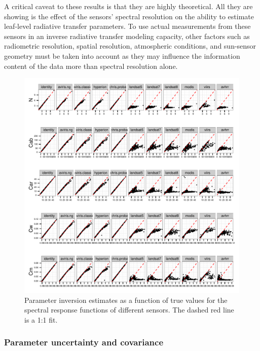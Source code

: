 {A critical caveat to these results is that they are highly theoretical. All
they are showing is the effect of the sensors' spectral resolution on the
ability to estimate leaf-level radiative transfer parameters. To use actual
measurements from these sensors in an inverse radiative transfer modeling
capacity, other factors such as radiometric resolution, spatial resolution,
atmospheric conditions, and sun-sensor geometry must be taken into account as
they may influence the information content of the data more than spectral
resolution alone.

\begin{figure}[h] \centering
  \centerline{ \includegraphics{figures/sensor-error}} 
  \caption{
    Parameter inversion estimates as a function of true values for the 
    spectral response functions of different sensors. The dashed red line is a 
    1:1 fit.
  }
  \label{fig:sensor-error}
\end{figure}

\subsubsection{Parameter uncertainty and covariance}

}
